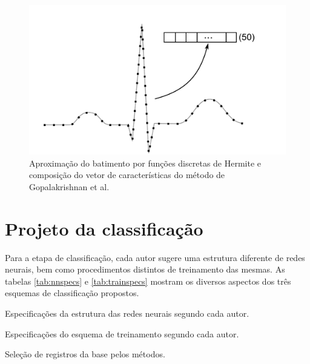 \begin{figure}[ht]
    \centering
    \includegraphics[width=400pt]{figures/chap6-gopalak-hermite.pdf}
    \caption[Aproximação do batimento por funções discretas de Hermite]{Aproximação do batimento por funções discretas de Hermite e composição do vetor de características do método de Gopalakrishnan et al.}
    \label{fig:gopalakherm}
\end{figure}

\section{Projeto da classificação}

Para a etapa de classificação, cada autor sugere uma estrutura diferente de redes neurais, bem como procedimentos distintos de treinamento das mesmas. As tabelas \ref{tab:nnspecs} e \ref{tab:trainspecs} mostram os diversos aspectos dos três esquemas de classificação propostos.

\begin{table}[ht!]
    \centering
    
    \caption[Especificações da estrutura das redes neurais segundo cada autor]{Especificações da estrutura das redes neurais segundo cada autor.}
    \label{tab:nnspecs}
\end{table}

\begin{table}[ht!]
    \centering
    
    \caption[Especificações do esquema de treinamento segundo cada autor]{Especificações do esquema de treinamento segundo cada autor.}
    \label{tab:trainspecs}
\end{table}

\begin{table}[ht!]
    \centering
    
    \caption[Seleção de registros da base pelos métodos]{Seleção de registros da base pelos métodos.}
    \label{tab:selection}
\end{table}


